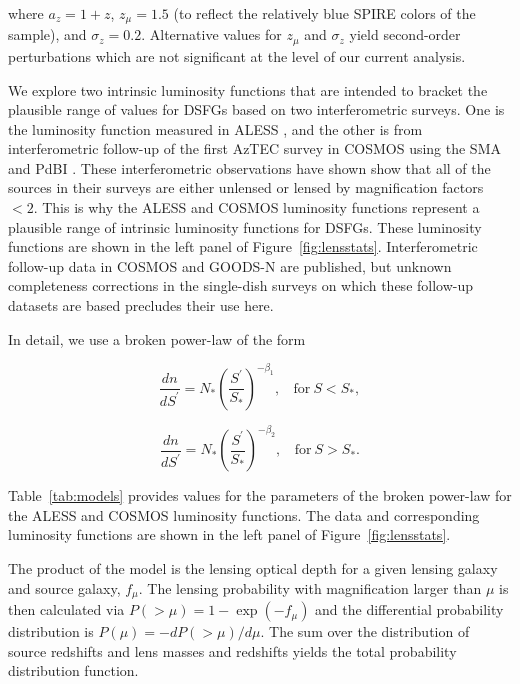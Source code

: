 \documentclass[iop]{emulateapj}
\begin{document}
\noindent where $a_z = 1 + z$, $z_\mu = 1.5$ (to reflect the relatively blue
SPIRE colors of the sample), and $\sigma_z = 0.2$.  Alternative
values for $z_\mu$ and $\sigma_z$ yield second-order perturbations which are
not significant at the level of our current analysis.

We explore two intrinsic luminosity functions that are intended to bracket the
plausible range of values for DSFGs based on two interferometric surveys.  One
is the luminosity function measured in ALESS \citep{Karim:2013lr}, and the
other is from interferometric follow-up of the first AzTEC survey in COSMOS
\citep{Scott:2008qy} using the SMA \citep{Younger:2007fk, Younger:2009lr} and
PdBI \citep{Miettinen:2015lr}.  These interferometric observations have shown
show that all of the sources in their surveys are either unlensed or lensed by
magnification factors $<2$.  This is why the ALESS and COSMOS luminosity
functions represent a plausible range of intrinsic luminosity functions for
DSFGs.  These luminosity functions are shown in the left panel of
Figure~\ref{fig:lensstats}.  Interferometric follow-up data in COSMOS
\citep{Smolcic:2012zl} and GOODS-N \citep{Barger:2012yg} are published, but
unknown completeness corrections in the single-dish surveys on which these
follow-up datasets are based precludes their use here.

In detail, we use a broken power-law of the form

\begin{equation}
\frac{dn}{dS^\prime} = N_\ast\left(\frac{S^\prime}{S_\ast}\right)^{-\beta_1},~~~~\textrm{for}~S<S_\ast,
\end{equation} 

\begin{displaymath}
\frac{dn}{dS^\prime} = N_\ast\left(\frac{S^\prime}{S_\ast}\right)^{-\beta_2},~~~~\textrm{for}~S>S_\ast.
\end{displaymath}

Table~\ref{tab:models} provides values for the parameters of the broken
power-law for the ALESS and COSMOS luminosity functions.  The data and
corresponding luminosity functions are shown in the left panel of
Figure~\ref{fig:lensstats}.



The product of the model is the lensing optical depth for a given lensing
galaxy and source galaxy,  $f_\mu$. The lensing probability with magnification
larger than $\mu$ is then calculated via $P(>\mu) = 1-\exp(-f_\mu)$ and the
differential probability distribution is $P(\mu) = -dP(>\mu)/d\mu$.  The sum
over the distribution of source redshifts and lens masses and redshifts yields
the total probability distribution function.
\end{document}
